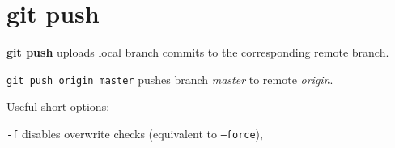 %

\section{git push}
\textbf{git push} uploads local branch commits to the corresponding remote branch.

\texttt{git push origin master} pushes branch \emph{master} to remote \emph{origin}.

Useful short options:
\begin{compactenum}
\item [\texttt{-f}] disables overwrite checks (equivalent to \texttt{--force}),
\end{compactenum}

%